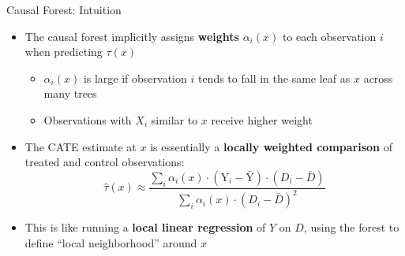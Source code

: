\documentclass[hyperref={pdfpagelabels=false}]{beamer}
\begin{document}
\begin{frame}{Causal Forest: Intuition}
	\begin{itemize}
		\item The causal forest implicitly assigns \textbf{weights} $\alpha_i(x)$ to each observation $i$ when predicting $\tau(x)$
		\vspace{0.2cm}
		\begin{itemize}
			\item $\alpha_i(x)$ is large if observation $i$ tends to fall in the same leaf as $x$ across many trees
			\vspace{0.2cm}
			\item Observations with $X_i$ similar to $x$ receive higher weight
		\end{itemize}
		\vspace{0.3cm}
		\item The CATE estimate at $x$ is essentially a \textbf{locally weighted comparison} of treated and control observations:
		\begin{equation*}
			\hat{\tau}(x) \approx \frac{\sum_i \alpha_i(x) \cdot (\mathrm{Y}_i - \bar{\mathrm{Y}}) \cdot (D_i - \bar{D})}{\sum_i \alpha_i(x) \cdot (D_i - \bar{D})^2}
		\end{equation*}
		\item This is like running a \textbf{local linear regression} of $Y$ on $D$, using the forest to define ``local neighborhood'' around $x$
	\end{itemize}
\end{frame}
\end{document}
